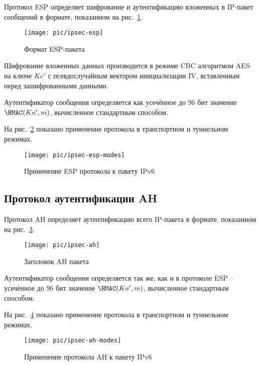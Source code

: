 Протокол ESP определяет шифрование и аутентификацию вложенных в IP-пакет сообщений в формате, показанном на рис.~\ref{fig:ipsec-esp}.

\begin{figure}[!ht]
	\centering
	\texttt{[image: pic/ipsec-esp]}
	\caption{Формат ESP-пакета\label{fig:ipsec-esp}}
\end{figure}

Шифрование вложенных данных производится в режиме CBC алгоритмом AES на ключе $Ke'$ с псевдослучайным вектором инициализации IV, вставленным перед зашифрованными данными.

Аутентификатор сообщения определяется как усечённое до 96 бит значение $\HMAC(Ka', m)$, вычисленное стандартным способом.

На рис.~\ref{fig:ipsec-esp-modes} показано применение протокола в транспортном и туннельном режимах.

\begin{figure}[!ht]
	\centering
	\texttt{[image: pic/ipsec-esp-modes]}
	\caption{Применение ESP протокола к пакету IPv6\label{fig:ipsec-esp-modes}}
\end{figure}


\subsection{Протокол аутентификации AH}

Протокол AH определяет аутентификацию всего IP-пакета в формате, показанном на рис.~\ref{fig:ipsec-ah}.

\begin{figure}[!ht]
	\centering
	\texttt{[image: pic/ipsec-ah]}
	\caption{Заголовок AH пакета\label{fig:ipsec-ah}}
\end{figure}

Аутентификатор сообщения определяется так же, как и в протоколе ESP -- усечённое до 96 бит значение $\HMAC(Ka', m)$, вычисленное стандартным способом.

На рис.~\ref{fig:ipsec-ah-modes} показано применение протокола в транспортном и туннельном режимах.

\begin{figure}[!ht]
	\centering
	\texttt{[image: pic/ipsec-ah-modes]}
	\caption{Применение протокола AH к пакету IPv6\label{fig:ipsec-ah-modes}}
\end{figure}

